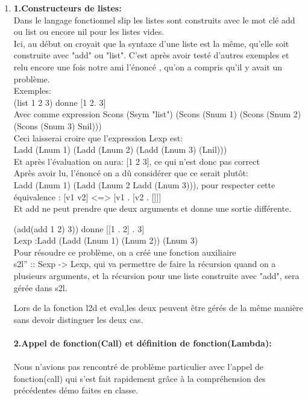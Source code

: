 \documentclass{article}
\begin{document}
\begin{enumerate}
    \item 
    \textbf{1.Constructeurs de listes:}\\
    Dans le langage fonctionnel slip les listes sont construits avec le mot clé add ou list ou encore nil pour les listes vides.\\
    Ici, au début on croyait que la syntaxe d'une liste est la même, qu'elle soit construite avec "add" ou "list". C'est après avoir testé d'autres exemples et relu encore une fois notre ami l'énoncé , qu'on a compris qu'il y avait un problème.\\
    Exemples:\\
      
      (list 1 2 3) donne  [1 2. 3]\\
      Avec comme expression Scons (Ssym "list") (Scons (Snum 1) (Scons (Snum 2) (Scons (Snum 3) Snil)))\\
      
      Ceci laisserai croire que l'expression Lexp est:\\ Ladd (Lnum 1) (Ladd (Lnum 2) (Ladd (Lnum 3) (Lnil)))\\
      
      Et après l'évaluation on aura: [1 2 3], ce qui n'est donc pas correct\\
      
     Après avoir lu, l'énoncé on a dû considérer que ce serait plutôt:\\
      Ladd (Lnum 1) (Ladd (Lnum 2 Ladd (Lnum 3))), pour respecter cette équivalence : [v1 v2] <=>  [v1 . [v2 . []]]\\
      
     Et add ne peut prendre que deux arguments et donne une sortie différente.
    
    (add(add 1 2) 3)) donne [[1 . 2] . 3] \\Lexp :Ladd (Ladd (Lnum 1) (Lnum 2)) (Lnum 3) \\
    
    Pour résoudre ce problème, on a créé une fonction auxiliaire\\
    s2l'' :: Sexp -> Lexp, qui va permettre de faire la récursion quand on a plusieurs arguments, et la récursion pour une liste construite avec "add", sera gérée dans s2l.
    
    Lors de la fonction l2d et eval,les deux peuvent être gérés de la même manière sans devoir distinguer les deux cas.\\
    \\
     \textbf{2.Appel de fonction(Call) et définition de fonction(Lambda):}\\ 
    \\
    Nous n’avions pas rencontré de problème particulier avec l’appel de fonction(call) qui s’est fait rapidement grâce à la compréhension des précédentes démo faites en classe.\\
    

\end{enumerate}
\end{document}
